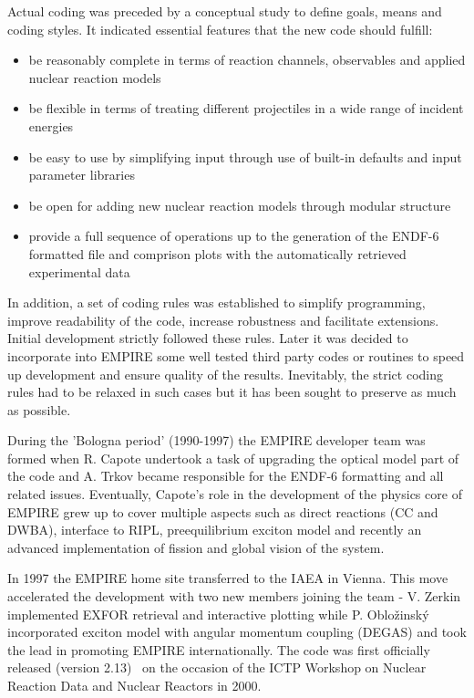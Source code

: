 \documentclass[twocolumn,amsmath,amssymb,10pt,groupedaddress,a4paper]{revtex4}
\begin{document}
Actual coding was preceded by a conceptual study to define goals, means and coding styles. It indicated essential features that the new code should fulfill:
\begin{itemize}
\item be reasonably complete in terms of reaction channels, observables and applied nuclear reaction models
\item be flexible in terms of treating different projectiles in a  wide range of incident energies
\item be easy to use by simplifying input through use of built-in defaults and input parameter libraries
\item be open for adding new nuclear reaction models through modular structure
\item provide a full sequence of operations  up to the generation of the ENDF-6 formatted file and comprison plots with the automatically retrieved experimental data
\end{itemize}
In addition, a set of coding rules was established to simplify programming, improve readability of the code, increase robustness and facilitate extensions. Initial development strictly followed these rules. Later it was decided to incorporate into EMPIRE some well tested third party codes or routines to speed up development and ensure quality of the results. Inevitably, the strict coding rules had to be relaxed in such cases but it has been sought to preserve as much as possible.

During the 'Bologna period' (1990-1997) the EMPIRE developer team was formed when R. Capote undertook a task of upgrading the optical model part of the code and A. Trkov became responsible for the ENDF-6 formatting and all related issues. Eventually, Capote's role in the development of the physics core of EMPIRE grew up to cover multiple aspects such as direct reactions (CC and DWBA), interface to RIPL, preequilibrium exciton model and recently an advanced implementation of fission and global vision of the system.

In 1997 the EMPIRE home site transferred to the IAEA in Vienna. This move accelerated the development with two new members joining the team - V. Zerkin implemented EXFOR retrieval and interactive plotting while P. Oblo\v zinsk\'y incorporated exciton model with angular momentum coupling (DEGAS) and took the lead in promoting EMPIRE internationally. The code was first officially released (version 2.13)~\cite{EMPIRE:Trieste01} on the occasion of the ICTP Workshop on Nuclear Reaction Data and Nuclear Reactors in 2000.
\end{document}
